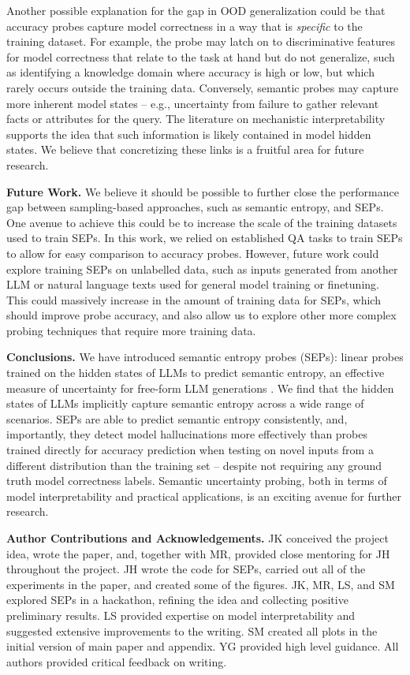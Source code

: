 \documentclass{article}
\begin{document}
Another possible explanation for the gap in OOD generalization could be that accuracy probes capture model correctness in a way that is \emph{specific} to the training dataset.
For example, the probe may latch on to discriminative features for model correctness that relate to the task at hand but do not generalize, such as identifying a knowledge domain where accuracy is high or low, but which rarely occurs outside the training data.
Conversely, semantic probes may capture more inherent model states -- e.g., uncertainty from failure to gather relevant facts or attributes for the query.
The literature on mechanistic interpretability \citep{nanda2023factfinding} supports the idea that such information is likely contained in model hidden states.
We believe that concretizing these links is a fruitful area for future research.


\textbf{Future Work.}
We believe it should be possible to further close the performance gap between sampling-based approaches, such as semantic entropy, and SEPs.
One avenue to achieve this could be to increase the scale of the training datasets used to train SEPs.
In this work, we relied on established QA tasks to train SEPs to allow for easy comparison to accuracy probes. However, future work could explore training SEPs on unlabelled data, such as inputs generated from another LLM or natural language texts used for general model training or finetuning.
This could massively increase in the amount of training data for SEPs, which should improve probe accuracy, and also allow us to explore other more complex probing techniques that require more training data.


\textbf{Conclusions.}
We have introduced semantic entropy probes (SEPs): linear probes trained on the hidden states of LLMs to predict semantic entropy, an effective measure of uncertainty for free-form LLM generations \citep{farquhar2024detecting}.
We find that the hidden states of LLMs implicitly capture semantic entropy across a wide range of scenarios.
SEPs are able to predict semantic entropy consistently, and, importantly, they detect model hallucinations more effectively than probes trained directly for accuracy prediction when testing on novel inputs from a different distribution than the training set -- despite not requiring any ground truth model correctness labels.
Semantic uncertainty probing, both in terms of model interpretability and practical applications, is an exciting avenue for further research.


\textbf{Author Contributions and Acknowledgements.}
JK conceived the project idea, wrote the paper, and, together with MR, provided close mentoring for JH throughout the project.
JH wrote the code for SEPs, carried out all of the experiments in the paper, and created some of the figures.
JK, MR, LS, and SM explored SEPs in a hackathon, refining the idea and collecting positive preliminary results.
LS provided expertise on model interpretability and suggested extensive improvements to the writing.
SM created all plots in the initial version of main paper and appendix.
YG provided high level guidance.
All authors provided critical feedback on writing.
\end{document}
